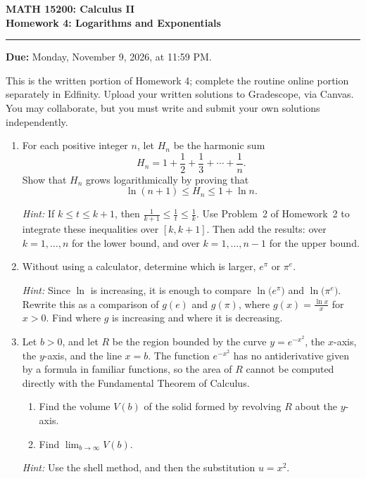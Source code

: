 \documentclass[12pt,letterpaper]{article}
\begin{document}
\begin{center}
  {\large\bfseries MATH 15200: Calculus II}\\
  {\large\bfseries Homework 4: Logarithms and Exponentials}
\end{center}

\vspace{0.25em}
\hrule
\vspace{0.8em}

\textbf{Due:} Monday, November 9, 2026, at 11:59 PM.

This is the written portion of Homework 4; complete the routine online portion
separately in Edfinity. Upload your written solutions to Gradescope, via Canvas. You may
collaborate, but you must write and submit your own solutions independently.



\vspace{0.8em}


\begin{enumerate}[label=\textbf{\arabic*.},leftmargin=2em,itemsep=1.25em]
  \item For each positive integer $n$, let \(H_n\) be the harmonic sum
    \[
      H_n=1+\frac12+\frac13+\cdots+\frac1n.
    \]
    Show that \(H_n\) grows logarithmically by proving that 
    \[
      \ln(n+1)\le H_n\le 1+\ln n.
    \]

    \emph{Hint:} If $k\le t\le k+1$, then $\frac{1}{k+1}\le\frac1t\le\frac1k$.
    Use Problem~2 of Homework~2 to integrate these inequalities over
    $[k,k+1]$. Then add the results: over $k=1,\dots,n$ for the lower bound,
    and over $k=1,\dots,n-1$ for the upper bound.

  \item Without using a calculator, determine which is larger, $e^\pi$ or
    $\pi^e$.

    \emph{Hint:} Since $\ln$ is increasing, it is enough to compare
    $\ln\bigl(e^\pi\bigr)$ and $\ln\bigl(\pi^e\bigr)$. Rewrite this as a
    comparison of $g(e)$ and $g(\pi)$, where $g(x)=\frac{\ln x}{x}$ for
    $x>0$. Find where $g$ is increasing and where it is decreasing.

  \item Let $b>0$, and let $R$ be the region bounded by the curve
    $y=e^{-x^2}$, the $x$-axis, the $y$-axis, and the line $x=b$. The function
    $e^{-x^2}$ has no antiderivative given by a formula in familiar functions,
    so the area of $R$ cannot be computed directly with the Fundamental
    Theorem of Calculus.
    \begin{enumerate}[label=(\alph*)]
      \item Find the volume $V(b)$ of the solid formed by revolving $R$ about
        the $y$-axis.
      \item Find $\displaystyle\lim_{b\to\infty}V(b)$.
    \end{enumerate}

    \emph{Hint:} Use the shell method, and then the substitution $u=x^2$.
\end{enumerate}
\end{document}

